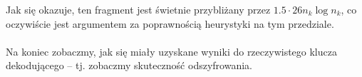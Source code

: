 \documentclass[a4paper]{article}
\theoremstyle{defn}
\theoremstyle{theorem}
\theoremstyle{lemma}
\theoremstyle{cor}
\theoremstyle{fact}
\begin{document}
Jak się okazuje, ten fragment jest świetnie przybliżany przez $1.5 \cdot 26 n_k \log n_k$, co oczywiście jest argumentem za poprawnością heurystyki na tym przedziale.\\\\
Na koniec zobaczmy, jak się miały uzyskane wyniki do rzeczywistego klucza dekodującego – tj. zobaczmy skuteczność odszyfrowania.
\begin{center}
\end{center}
\end{document}
